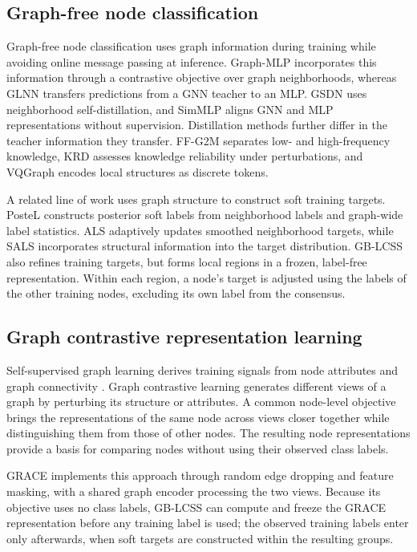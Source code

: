 \documentclass[times,review,10pt]{elsarticle}
\theoremstyle{definition}
\theoremstyle{plain}
\begin{document}
\subsection{Graph-free node classification}\label{sec:2.3}

Graph-free node classification uses graph information during training while avoiding online message passing at inference. Graph-MLP \cite{ref3} incorporates this information through a contrastive objective over graph neighborhoods, whereas GLNN \cite{ref4} transfers predictions from a GNN teacher to an MLP. GSDN \cite{ref40} uses neighborhood self-distillation, and SimMLP \cite{ref41} aligns GNN and MLP representations without supervision. Distillation methods further differ in the teacher information they transfer. FF-G2M \cite{ref45} separates low- and high-frequency knowledge, KRD \cite{ref46} assesses knowledge reliability under perturbations, and VQGraph \cite{ref47} encodes local structures as discrete tokens.

A related line of work uses graph structure to construct soft training targets. PosteL \cite{ref54} constructs posterior soft labels from neighborhood labels and graph-wide label statistics. ALS \cite{ref55} adaptively updates smoothed neighborhood targets, while SALS \cite{ref56} incorporates structural information into the target distribution. GB-LCSS also refines training targets, but forms local regions in a frozen, label-free representation. Within each region, a node's target is adjusted using the labels of the other training nodes, excluding its own label from the consensus.

\subsection{Graph contrastive representation learning}\label{sec:2.4}

Self-supervised graph learning derives training signals from node attributes and graph connectivity \cite{ref57}. Graph contrastive learning generates different views of a graph by perturbing its structure or attributes. A common node-level objective brings the representations of the same node across views closer together while distinguishing them from those of other nodes. The resulting node representations provide a basis for comparing nodes without using their observed class labels.

GRACE \cite{ref12} implements this approach through random edge dropping and feature masking, with a shared graph encoder processing the two views. Because its objective uses no class labels, GB-LCSS can compute and freeze the GRACE representation before any training label is used; the observed training labels enter only afterwards, when soft targets are constructed within the resulting groups.
\end{document}
